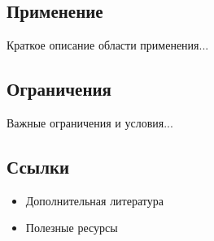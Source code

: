 \documentclass[10pt,landscape,a4paper]{article}
\begin{document}
\subsection{Применение}
Краткое описание области применения...

\subsection{Ограничения}
Важные ограничения и условия...

\subsection{Ссылки}
\begin{itemize}
    \item Дополнительная литература
    \item Полезные ресурсы
\end{itemize}

\HSETwoColsEnd


\HSEFooter
\end{document}
